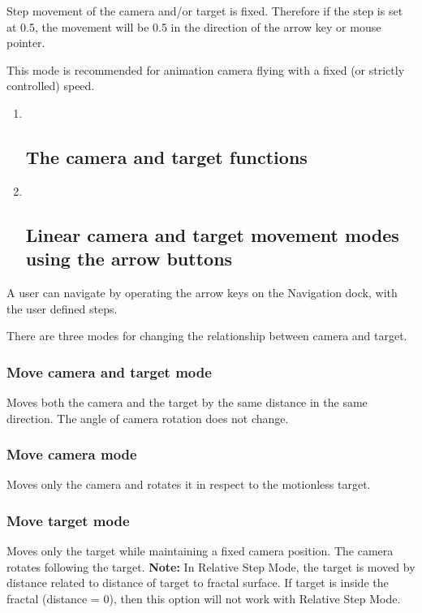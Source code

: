 Step movement of the camera and/or target is fixed. Therefore if the
step is set at 0.5, the movement will be 0.5 in the direction of the
arrow key or mouse pointer.

This mode is recommended for animation camera flying with a fixed (or
strictly controlled) speed.

\begin{enumerate}
\def\labelenumi{\arabic{enumi}.}
\item ~
  \subsection{The camera and target
  functions}\label{the-camera-and-target-functions}
\item ~
  \subsection{Linear camera and target movement modes using the arrow
  buttons}\label{linear-camera-and-target-movement-modes-using-the-arrow-buttons}
\end{enumerate}

A user can navigate by operating the arrow keys on the Navigation dock,
with the user defined steps.

There are three modes for changing the relationship between camera and
target.

\subsubsection{Move camera and target
mode}\label{move-camera-and-target-mode}

Moves both the camera and the target by the same distance in the same
direction. The angle of camera rotation does not change.

\subsubsection{Move camera mode}\label{move-camera-mode}

Moves only the camera and rotates it in respect to the motionless
target.

\subsubsection{Move target mode}\label{move-target-mode}

Moves only the target while maintaining a fixed camera position. The
camera rotates following the target. \textbf{Note:} In Relative Step
Mode, the target is moved by distance related to distance of target to
fractal surface. If target is inside the fractal (distance = 0), then
this option will not work with Relative Step Mode.

